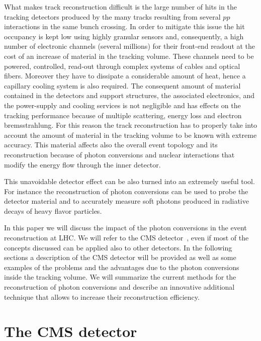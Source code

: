 \documentclass[a4paper]{jpconf}
\begin{document}
What makes  track reconstruction difficult is  
the large number of hits in the tracking detectors
produced by the many tracks resulting from several $pp$ interactions in the same bunch crossing. In order to mitigate this issue the hit occupancy is kept low using highly granular sensors and, consequently, a high number of electronic channels (several millions) for their front-end readout at the cost of an increase of material in the tracking volume. These channels need to be powered, controlled, read-out through  complex systems of cables and optical fibers. Moreover they have to dissipate a considerable amount of heat, hence a capillary cooling system is also required.
The consequent amount of material  contained in the detectors and support structures, the associated electronics, and the power-supply and cooling services is not negligible and has effects on the tracking performance because of multiple scattering, energy loss and electron bremsstrahlung. 
For this reason the track reconstruction has to properly take into account the amount of material in the tracking volume to be known with extreme accuracy.  
This material  affects also the overall event topology and its reconstruction because of photon conversions and nuclear interactions that modify the energy flow through the inner detector.

This unavoidable detector effect   can be also turned into an extremely useful tool. For instance the reconstruction of photon conversions can be used to probe the detector material and to accurately measure soft photons produced in radiative decays of heavy flavor particles. %
 
In this paper we will discuss the impact of the photon conversions in the event reconstruction at LHC.  We will refer to the CMS detector~\cite{JINST}, even if most of the concepts discussed can be applied also to other detectors. 
In the following sections a description of the CMS detector will be provided as well as some examples of the  problems and the advantages due to the photon conversions inside the tracking volume.
We will summarize the current methods for the reconstruction of photon conversions and describe an innovative additional technique that allows to increase their reconstruction efficiency.


\section{The CMS detector}
\end{document}
